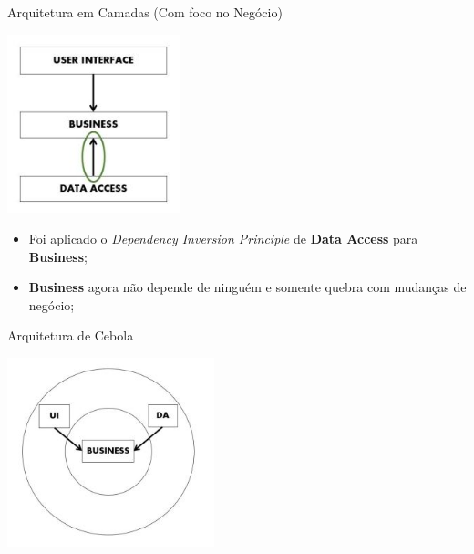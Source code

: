 \documentclass[aspectratio=169]{beamer}
\begin{document}
\begin{frame}{Arquitetura em Camadas (Com foco no Negócio)}	
	\begin{multicols}{2}		
		\begin{center}
			\includegraphics[width=5cm]{imgs/dip-layered-architecture}
		\end{center}
		\begin{itemize}	
			\item Foi aplicado o \textit{Dependency Inversion Principle} de \textbf{Data Access} para \textbf{Business};
			\item \textbf{Business} agora não depende de ninguém e somente quebra com mudanças de negócio;
		\end{itemize}
	\end{multicols}
\end{frame}

\begin{frame}{Arquitetura de Cebola}			
	\begin{center}
		\includegraphics[width=6cm]{imgs/onion-architecture}
	\end{center}
\end{frame}
\end{document}
